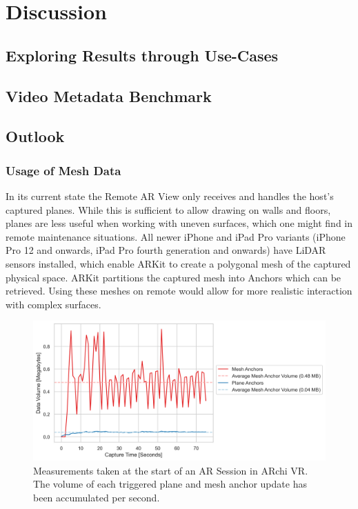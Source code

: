 \documentclass{article}
\begin{document}
\section{Discussion}
\subsection{Exploring Results through Use-Cases}
\subsection{Video Metadata Benchmark}
\subsection{Outlook}
\newpage
\subsubsection{Usage of Mesh Data}
In its current state the Remote AR View only receives and handles the host's captured planes. While this is sufficient to allow drawing on walls and floors, planes are less useful when working with uneven surfaces, which one might find in remote maintenance situations. All newer iPhone and iPad Pro variants (iPhone Pro 12 and onwards, iPad Pro fourth generation and onwards) have LiDAR sensors installed, which enable ARKit to create a polygonal mesh of the captured physical space. ARKit partitions the captured mesh into Anchors which can be retrieved. Using these meshes on remote would allow for more realistic interaction with complex surfaces.\\

\begin{figure}[H]
  \centering
  \includegraphics[width=1\textwidth]{img/mesh_plane_comparison.png}
  \caption{Measurements taken at the start of an AR Session in ARchi VR. The volume of each triggered plane and mesh anchor update has been accumulated per second.}
  \label{fig:mesh_compare}
\end{figure}
\end{document}
